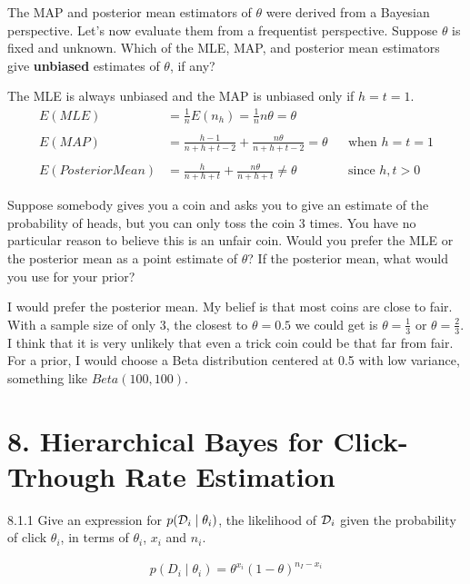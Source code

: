 \documentclass[12pt,letterpaper]{article}
\begin{document}
\begin{problem}{7.4}
    The MAP and posterior mean estimators of $\theta$
    were derived from a Bayesian perspective. Let's now evaluate them
    from a frequentist perspective. Suppose $\theta$ is fixed and unknown.
    Which of the MLE, MAP, and posterior mean estimators give \textbf{unbiased}
    estimates of $\theta$, if any?
\end{problem}
\begin{solution}{}
    The MLE  is always unbiased and the MAP is unbiased only if $h=t=1$.
    \begin{align*}
        E(MLE) &= \frac{1}{n}E(n_h) = \frac{1}{n}n\theta = \theta\\
        \\
        E(MAP) &= \frac{h-1}{n+h+t-2} + \frac{n\theta}{n+h+t-2} = \theta &&\text{when $h=t=1$}\\
        \\
        E(Posterior Mean) &= \frac{h}{n+h+t} + \frac{n\theta}{n+h+t} \neq \theta &&\text{since $h,t>0$}
    \end{align*}
\end{solution}
\newpage

\begin{problem}{7.5}
     Suppose somebody gives you a coin and asks you to give
    an estimate of the probability of heads, but you can only toss the
    coin $3$ times. You have no particular reason to believe this is
    an unfair coin. Would you prefer the MLE or the posterior mean as
    a point estimate of $\theta$? If the posterior mean, what would you
    use for your prior?
\end{problem}
\begin{solution}{}
    I would prefer the posterior mean. My belief is that most coins are close to fair. With a sample size of only 3, the closest to 
    $\theta=0.5$ we could get is $\theta=\frac{1}{3}$ or $\theta=\frac{2}{3}$. I think that it is very unlikely that even a trick coin could 
    be that far from fair. For a prior, I would choose a Beta distribution centered at 0.5 with low variance, something like $Beta(100,100)$.
\end{solution}
\newpage

\section*{8. Hierarchical Bayes for Click-Trhough Rate Estimation}
\begin{problem}{8.1.1}
     Give an expression for $p(\mathcal{D}_{i}\mid\theta_{i})$, the likelihood
    of $\mathcal{D}_{i}$ given the probability of click $\theta_{i}$, in terms
    of $\theta_{i}$, $x_{i}$ and $n_{i}$.
\end{problem}
\begin{solution}{}
    \begin{align*}
        p(D_i\mid\theta_i) = \theta^{x_i}(1-\theta)^{n_I-x_i}
    \end{align*}
\end{solution}
\newpage
\end{document}
